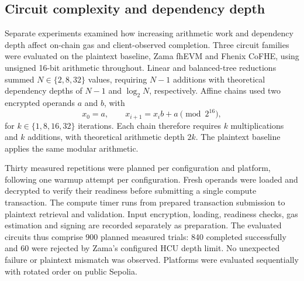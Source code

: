 \subsection{Circuit complexity and dependency depth}
\label{sec:circuit-complexity}

Separate experiments examined how increasing arithmetic work and dependency depth affect on-chain gas and client-observed completion. Three circuit families were evaluated on the plaintext baseline, Zama fhEVM and Fhenix CoFHE, using unsigned 16-bit arithmetic throughout. Linear and balanced-tree reductions summed $N\in\{2,8,32\}$ values, requiring $N-1$ additions with theoretical dependency depths of $N-1$ and $\log_2N$, respectively. Affine chains used two encrypted operands $a$ and $b$, with
\[
x_0=a,\qquad x_{i+1}=x_i b+a\pmod{2^{16}},
\]
for $k\in\{1,8,16,32\}$ iterations. Each chain therefore requires $k$ multiplications and $k$ additions, with theoretical arithmetic depth $2k$. The plaintext baseline applies the same modular arithmetic.

Thirty measured repetitions were planned per configuration and platform, following one warmup attempt per configuration. Fresh operands were loaded and decrypted to verify their readiness before submitting a single compute transaction. The compute timer runs from prepared transaction submission to plaintext retrieval and validation. Input encryption, loading, readiness checks, gas estimation and signing are recorded separately as preparation. The evaluated circuits thus comprise 900 planned measured trials: 840 completed successfully and 60 were rejected by Zama's configured HCU depth limit. No unexpected failure or plaintext mismatch was observed. Platforms were evaluated sequentially with rotated order on public Sepolia.

